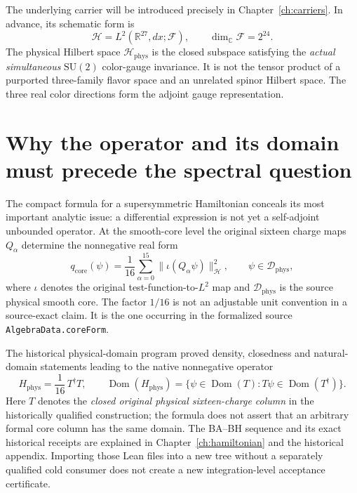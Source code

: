 The underlying carrier will be introduced precisely in
Chapter~\ref{ch:carriers}. In advance, its schematic form is
\begin{equation}\label{eq:intro-full-hilbert}
 \mathscr H=L^2(\mathbb R^{27},dx;\mathcal F),\qquad
 \dim_{\mathbb C}\mathcal F=2^{24}.
\end{equation}
The physical Hilbert space $\mathscr H_{\mathrm{phys}}$ is the closed
subspace satisfying the \emph{actual simultaneous} $\mathrm{SU}(2)$
color-gauge invariance. It is not the tensor product of a purported
three-family flavor space and an unrelated spinor Hilbert space. The
three real color directions form the adjoint gauge representation.

\section{Why the operator and its domain must precede the spectral question}

The compact formula for a supersymmetric Hamiltonian conceals its most
important analytic issue: a differential expression is not yet a
self-adjoint unbounded operator. At the smooth-core level the original
sixteen charge maps $Q_\alpha$ determine the nonnegative real form
\begin{equation}\label{eq:intro-core-form}
 q_{\mathrm{core}}(\psi)
 =\frac1{16}\sum_{\alpha=0}^{15}
   \bigl\|\iota(Q_\alpha\psi)\bigr\|_{\mathscr H}^{2},
 \qquad \psi\in\mathscr D_{\mathrm{phys}},
\end{equation}
where $\iota$ denotes the original test-function-to-$L^2$ map and
$\mathscr D_{\mathrm{phys}}$ is the source physical smooth core. The
factor $1/16$ is not an adjustable unit convention in a source-exact
claim. It is the one occurring in the formalized source
\texttt{AlgebraData.coreForm}.

The historical physical-domain program proved density, closedness and
natural-domain statements leading to the native nonnegative operator
\begin{equation}\label{eq:intro-physical-hamiltonian}
 H_{\mathrm{phys}}=\frac1{16}\,T^\dagger T,
 \qquad
 \operatorname{Dom}(H_{\mathrm{phys}})
 =\{\psi\in\operatorname{Dom}(T):
       T\psi\in\operatorname{Dom}(T^\dagger)\}.
\end{equation}
Here $T$ denotes the \emph{closed original physical sixteen-charge
column} in the historically qualified construction; the formula does
not assert that an arbitrary formal core column has the same domain.
The BA--BH sequence and its exact historical receipts are explained
in Chapter~\ref{ch:hamiltonian} and the historical appendix. Importing
those Lean files into a new tree without a separately qualified cold
consumer does not create a new integration-level acceptance certificate.

